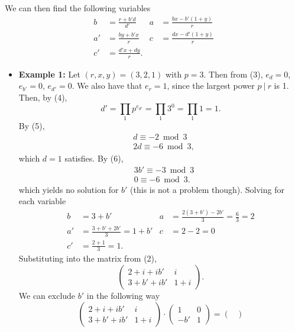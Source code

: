 \documentclass[9pt]{article}
\begin{document}
\begin{itemize}
	We can then find the following variables
	\begin{align*}
	b &= \frac{r + b'd}{d'} & a &= \frac{bx - b'(1+y)}{r} \\
	a' &= \frac{by + b'x}{r} & c &= \frac{dx - d'(1+y)}{r} \\
	c' &= \frac{d'x + dy}{r}.
	\end{align*}
	\begin{itemize}
		\item \textbf{Example 1:} Let $(r,x,y) = (3,2,1)$ with $p=3$. Then from (3), $e_d = 0$, $e_{b'} = 0$, $e_{d'} = 0$. We also have that $e_r = 1$, since the largest power $p~|~r$ is 1. Then, by (4),
		\begin{equation*}
		d' = \prod_{1} p^{e_{d'}} = \prod_{1} 3^0 = \prod_{1} 1 = 1.
		\end{equation*}
		By (5),
		\begin{align*}
		& d \equiv -2 \bmod 3 \\
		& 2d \equiv -6 \bmod 3,
		\end{align*}
		which $d=1$ satisfies. By (6),
		\begin{align*}
		& 3b' \equiv -3 \bmod 3 \\
		& 0 \equiv -6 \bmod 3.
		\end{align*}
		which yields no solution for $b'$ (this is not a problem though). Solving for each variable
		\begin{align*}
		b &= 3 + b' & a &= \frac{2(3 + b') - 2b'}{3} = \frac{6}{3} = 2\\
		a' &= \frac{3 + b' + 2b'}{3} = 1 + b' & c &= 2 - 2 = 0 \\
		c' &= \frac{2 + 1}{3} = 1.
		\end{align*}
		Substituting into the matrix from (2),
		\begin{equation*}
		\begin{pmatrix}
		2 + i + ib' & i \\
		3 + b' + ib' & 1 + i
		\end{pmatrix}.
		\end{equation*}
		We can exclude $b'$ in the following way
		\begin{equation*}
		\begin{pmatrix}
		2 + i + ib' & i \\
		3 + b' + ib' & 1 + i
		\end{pmatrix}
		\cdot 
		\begin{pmatrix}
		1 & 0 \\
		-b' & 1
		\end{pmatrix}
		= 
		\begin{pmatrix}

\end{pmatrix}
\end{equation*}
\end{itemize}
\end{itemize}
\end{document}
